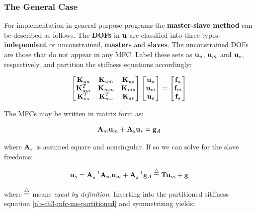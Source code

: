 \subsubsection{The General Case}

For implementation in general-purpose programs the \textbf{master-slave method}
can be described as follows. The \textbf{DOFs} in $ \mathbf{u} $ are classified
into three types: \textbf{independent} or unconstrained, \textbf{masters} and
\textbf{slaves}. The unconstrained DOFs are those that do not appear in any MFC.
Label these sets as $ \mathbf{u}_u $, $ \mathbf{u}_m $ and $ \mathbf{u}_s $,
respectively, and partition the stiffness equations accordingly:

\begin{equation}\label{nb-ch3-mfc-ms-partitioned}
    \begin{bmatrix}
        \mathbf{K}_{uu} & \mathbf{K}_{um} & \mathbf{K}_{us} \\
        \mathbf{K}_{um}^T & \mathbf{K}_{mm} & \mathbf{K}_{ms} \\
        \mathbf{K}_{us}^T & \mathbf{K}_{ms}^T & \mathbf{K}_{ss}
    \end{bmatrix}
    \begin{bmatrix}
        \mathbf{u}_u \\
        \mathbf{u}_m \\
        \mathbf{u}_s
    \end{bmatrix}
    = \begin{bmatrix}
        \mathbf{f}_u \\
        \mathbf{f}_m \\
        \mathbf{f}_s \\
    \end{bmatrix}
\end{equation}

The MFCs may be written in matrix form as:

\begin{equation}
    \mathbf{A}_m \mathbf{u}_m + \mathbf{A}_s \mathbf{u}_s = \mathbf{g}_A
\end{equation}

where $ \mathbf{A}_s $ is assumed square and nonsingular. If so we can solve for
the slave freedoms:

\begin{equation}
    \mathbf{u}_s = \mathbf{A}_s^{-1} \mathbf{A}_m \mathbf{u}_m
    + \mathbf{A}_s^{-1} \mathbf{g}_A
    \stackrel{\triangle}{=} \mathbf{T} \mathbf{u}_m + \mathbf{g}
\end{equation}

where $ \stackrel{\triangle}{=} $ means \textit{equal by definition}. Inserting into the partitioned
sitffness equation \eqref{nb-ch3-mfc-ms-partitioned} and symmetrizing yields:

